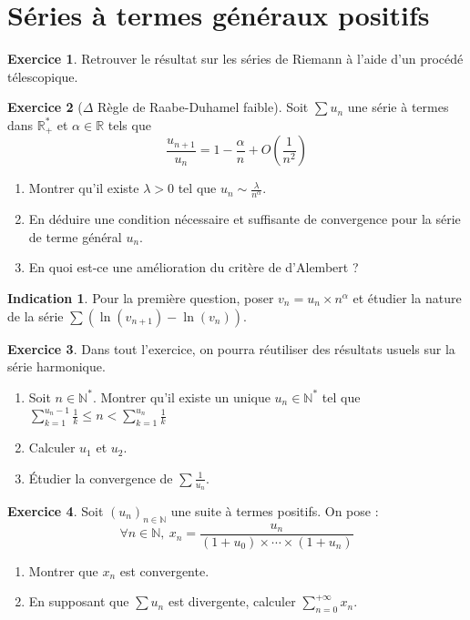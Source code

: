 \documentclass[french]{book}
\newcommand{\N}{\mathbb{N}}
\newcommand{\R}{\mathbb{R}}
\newcommand{\st}{^*}
\theoremstyle{definition}
\newtheorem{ex}{Exercice}[chapter]
\theoremstyle{theorem}
\newtheorem*{ind}{Indication}
\theoremstyle{remark}
\begin{document}
\section{Séries à termes généraux positifs}

\begin{ex}
	Retrouver le résultat sur les séries de Riemann à l'aide d'un procédé télescopique.
\end{ex}

\begin{ex}[$\Delta$ Règle de Raabe-Duhamel faible]
	Soit $\sum u_n$ une série à termes dans $\R_+\st$ et $\alpha\in\R$ tels que $$\frac{u_{n+1}}{u_n}=1-\frac{\alpha}{n}+O\left(\frac{1}{n^2}\right)$$
	\begin{enumerate}
		\item Montrer qu'il existe $\lambda>0$ tel que $u_n\sim\displaystyle\frac{\lambda}{n^{\alpha}}$.
		\item En déduire une condition nécessaire et suffisante de convergence pour la série de terme général $u_n$.
		\item En quoi est-ce une amélioration du critère de d'Alembert ?
	\end{enumerate}
\end{ex}

\begin{ind}
	Pour la première question, poser $v_n=u_n\times n^\alpha$ et étudier la nature de la série $\displaystyle\sum\left(\ln(v_{n+1})-\ln(v_n)\right)$.
\end{ind}

\begin{ex}
	Dans tout l'exercice, on pourra réutiliser des résultats usuels sur la série harmonique.
	\begin{enumerate}
		\item Soit $n\in\N\st$. Montrer qu'il existe un unique $u_n\in\N\st$ tel que $\displaystyle\sum_{k=1}^{u_n-1}\frac{1}{k}\leqslant n<\sum_{k=1}^{u_n}\frac{1}{k}$
		\item Calculer $u_1$ et $u_2$.
		\item Étudier la convergence de $\displaystyle\sum\frac{1}{u_n}$.
	\end{enumerate}
\end{ex}

\begin{ex}
	Soit $(u_n)_{n\in\N}$ une suite à termes positifs. On pose : $$\forall n\in\N,\ x_n=\frac{u_n}{(1+u_0)\times\cdots\times(1+u_n)}$$
	\begin{enumerate}
		\item Montrer que $\displaystyle x_n$ est convergente.
		\item En supposant que $\sum u_n$ est divergente, calculer $\displaystyle\sum_{n=0}^{+\infty}x_n$.
	\end{enumerate}
\end{ex}
\end{document}
